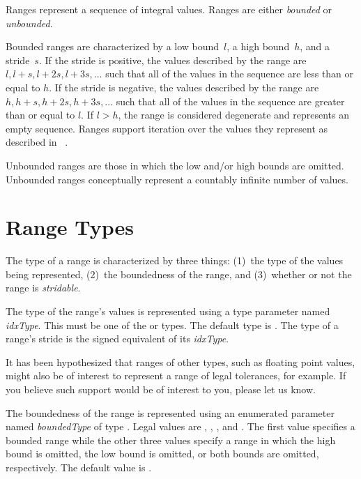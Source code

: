 \label{Ranges}

Ranges represent a sequence of integral values.  Ranges are
either \emph{bounded} or \emph{unbounded}.

Bounded ranges are characterized by a low bound~$l$, a high bound~$h$,
and a stride~$s$.  If the stride is positive, the values described by
the range are $l, l+s, l+2s, l+3s, ...$ such that all of the values in
the sequence are less than or equal to $h$.  If the stride is negative,
the values described by the range are $h, h+s, h+2s, h+3s, ...$ such
that all of the values in the sequence are greater than or equal to
$l$.  If $l > h$, the range is considered degenerate and represents an
empty sequence. Ranges support iteration over the values they represent
as described in ~.

Unbounded ranges are those in which the low and/or high bounds are
omitted.  Unbounded ranges conceptually represent a countably infinite
number of values.

\section{Range Types}
\label{Range_Types}

The type of a range is characterized by three things:
(1)~the type of the values being represented, (2)~the boundedness of
the range, and (3)~whether or not the range is \emph{stridable}.

The type of the range's values is represented using a type parameter
named \emph{idxType}.  This must be one of the  or
 types.  The default type is .
The type of a range's stride is the signed equivalent of its \emph{idxType}.

\begin{openissue}
It has been hypothesized that ranges of other types, such as floating
point values, might also be of interest to represent a range of legal
tolerances, for example.  If you believe such support would be of
interest to you, please let us know.
\end{openissue}

The boundedness of the range is represented using an enumerated
parameter named \emph{boundedType} of type .
Legal values are , ,
, and .  The first value specifies
a bounded range while the other three values specify a range in which
the high bound is omitted, the low bound is omitted, or both bounds
are omitted, respectively.  The default value is .

